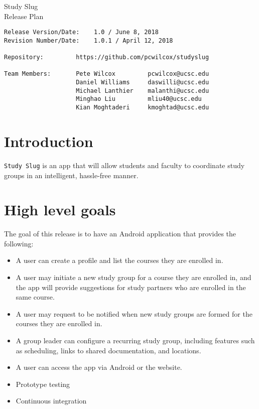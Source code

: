 \documentclass[10pt]{article}
\begin{document}
    
    \begin{center}
        \Huge{Study Slug} \\
        \Large{Release Plan}
    \end{center}
    \begin{verbatim}
Release Version/Date:    1.0 / June 8, 2018        
Revision Number/Date:    1.0.1 / April 12, 2018

Repository:         https://github.com/pcwilcox/studyslug

Team Members:       Pete Wilcox         pcwilcox@ucsc.edu    
                    Daniel Williams     daswilli@ucsc.edu  
                    Michael Lanthier    malanthi@ucsc.edu  
                    Minghao Liu         mliu40@ucsc.edu
                    Kian Moghtaderi     kmoghtad@ucsc.edu
    \end{verbatim}
    
    \section{Introduction}
    \texttt{Study Slug} is an app that will allow students and faculty to coordinate study groups in an intelligent, hassle-free manner.
    
    \section{High level goals}
    The goal of this release is to have an Android application that provides the following:
    \begin{itemize}
        \item A user can create a profile and list the courses they are enrolled in.
        \item A user may initiate a new study group for a course they are enrolled in, and the app will provide suggestions for study partners who are enrolled in the same course.
        \item A user may request to be notified when new study groups are formed for the courses they are enrolled in.
        \item A group leader can configure a recurring study group, including features such as scheduling, links to shared documentation, and locations.
        \item A user can access the app via Android or the website.
        \item Prototype testing
        \item Continuous integration
    \end{itemize}
    
\end{document}
